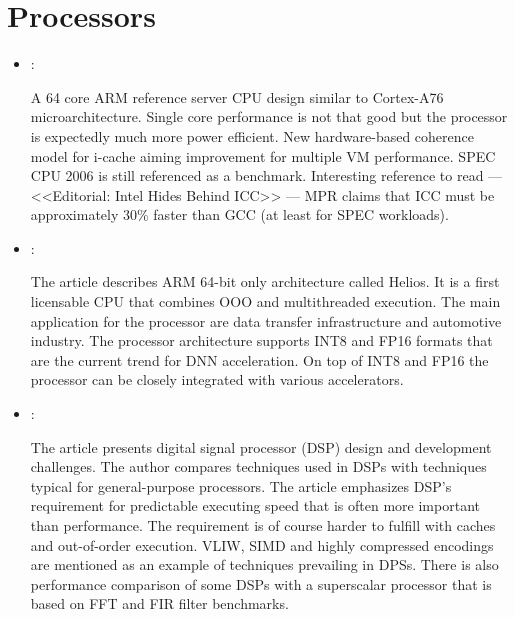 \section*{Processors}
\begin{itemize}
    \item \cite{Gwennap:ARM-Neoverse:2019}:

    A 64 core ARM reference server CPU design similar to Cortex-A76 microarchitecture. Single core performance is not that good but the processor is expectedly much more power efficient. New hardware-based coherence model for i-cache aiming improvement for multiple VM performance. SPEC CPU 2006 is still referenced as a benchmark. Interesting reference to read --- <<Editorial: Intel Hides Behind ICC>> --- MPR claims that ICC must be approximately 30\% faster than GCC (at least for SPEC workloads).

    \item \cite{Demler:Helios:2019}:

    The article describes ARM 64-bit only architecture called Helios. It is a first licensable CPU that combines OOO and multithreaded execution. The main application for the processor are data transfer infrastructure and automotive industry. The processor architecture supports INT8 and FP16 formats that are the current trend for DNN acceleration. On top of INT8 and FP16 the processor can be closely integrated with various accelerators.

    \item \cite{Eyre:DSP-Derby:2001}:

    The article presents digital signal processor (DSP) design and development challenges. The author compares techniques used in DSPs with techniques typical for general-purpose processors. The article emphasizes DSP's requirement for predictable executing speed that is often more important than performance. The requirement is of course harder to fulfill with caches and out-of-order execution. VLIW, SIMD and highly compressed encodings are mentioned as an example of techniques prevailing in DPSs. There is also performance comparison of some DSPs with a superscalar processor that is based on FFT and FIR filter benchmarks.
\end{itemize}

